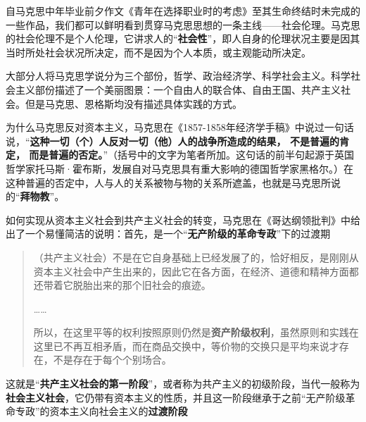 自马克思中年毕业前夕作文《青年在选择职业时的考虑》至其生命终结时未完成的一些作品，我们都可以鲜明看到贯穿马克思思想的一条主线——社会伦理。马克思的社会伦理不是个人伦理，它讲求人的“\textbf{社会性}”，即人自身的伦理状况主要是因其当时所处社会状况所决定，而不是因为个人本质，或主观能动所决定。

大部分人将马克思学说分为三个部份，哲学、政治经济学、科学社会主义。科学社会主义部份描述了一个美丽图景：一个自由人的联合体、自由王国、共产主义社会。但是马克思、恩格斯均没有描述具体实践的方式。

为什么马克思反对资本主义，马克思在《1857-1858年经济学手稿》中说过一句话说，“\textbf{这种一切（个）人反对一切（他）人的战争所造成的结果， 不是普遍的肯定， 而是普遍的否定。}”（括号中的文字为笔者所加。这句话的前半句起源于英国哲学家托马斯·霍布斯，发展自对马克思具有重大影响的德国哲学家黑格尔。）在这种普遍的否定中，人与人的关系被物与物的关系所遮盖，也就是马克思所说的“\textbf{拜物教}”。

如何实现从资本主义社会到共产主义社会的转变，马克思在《哥达纲领批判》中给出了一个易懂简洁的说明：首先，是一个“\textbf{无产阶级的革命专政}”下的过渡期
\begin{quotation}（共产主义社会）不是在它自身基础上已经发展了的，恰好相反，是刚刚从资本主义社会中产生出来的，因此它在各方面，在经济、道德和精神方面都还带着它脱胎出来的那个旧社会的痕迹。

  ……

  所以，在这里平等的权利按照原则仍然是\textbf{资产阶级权利}，虽然原则和实践在这里已不再互相矛盾，而在商品交换中，等价物的交换只是平均来说才存在，不是存在于每个个别场合。
\end{quotation}这就是“\textbf{共产主义社会的第一阶段}”，或者称为共产主义的初级阶段，当代一般称为\textbf{社会主义社会}，它仍带有资本主义的性质，并且这一阶段继承于之前“无产阶级革命专政”的资本主义向社会主义的\textbf{过渡阶段}

